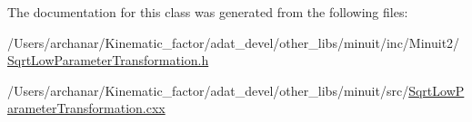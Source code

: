 The documentation for this class was generated from the following files\+:\begin{DoxyCompactItemize}
\item 
/\+Users/archanar/\+Kinematic\+\_\+factor/adat\+\_\+devel/other\+\_\+libs/minuit/inc/\+Minuit2/\mbox{\hyperlink{other__libs_2minuit_2inc_2Minuit2_2SqrtLowParameterTransformation_8h}{Sqrt\+Low\+Parameter\+Transformation.\+h}}\item 
/\+Users/archanar/\+Kinematic\+\_\+factor/adat\+\_\+devel/other\+\_\+libs/minuit/src/\mbox{\hyperlink{SqrtLowParameterTransformation_8cxx}{Sqrt\+Low\+Parameter\+Transformation.\+cxx}}\end{DoxyCompactItemize}
